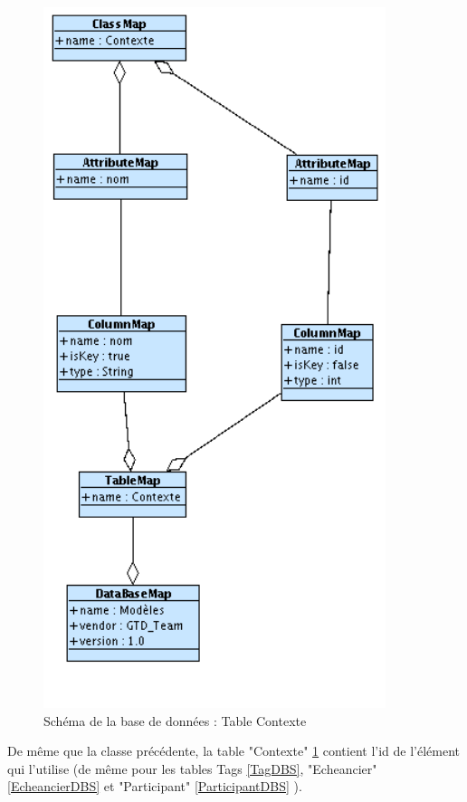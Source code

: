 \begin{figure}[htbp]

		\includegraphics[width=10cm]{images/L4/ContexteDBS.png}
	\caption{Schéma de la base de données : Table Contexte}
	\label{ContexteDBS}
\end{figure}
De même que la classe précédente, la table "Contexte" \ref{ContexteDBS} contient l'id de l'élément qui l'utilise (de même pour les tables Tags \ref{TagDBS}, "Echeancier" \ref{EcheancierDBS} et "Participant" \ref{ParticipantDBS} ).\\


